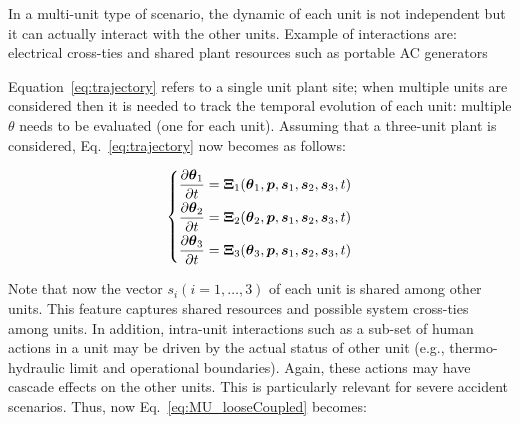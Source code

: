 In a multi-unit type of scenario, the dynamic of each unit is not independent but it can actually 
interact with the other units. Example of interactions are: electrical cross-ties and shared plant 
resources such as portable AC generators

Equation~\ref{eq:trajectory} refers to a single unit plant site; when multiple units are considered 
then it is needed to track the temporal evolution of each unit: multiple $\theta$ needs to be evaluated 
(one for each unit). 
Assuming that a three-unit plant is considered, Eq.~\ref{eq:trajectory} now becomes as follows:

\begin{equation}
  \begin{matrix}
     \begin{dcases*}
       \frac{\partial \boldsymbol{\theta}_1}{\partial t}  = \boldsymbol{\Xi}_1 (\boldsymbol{\theta}_1 , \boldsymbol p, \boldsymbol{s}_1 , \boldsymbol{s}_2 , \boldsymbol{s}_3, t)  \\     
       \frac{\partial \boldsymbol{\theta}_2}{\partial t}  = \boldsymbol{\Xi}_2 (\boldsymbol{\theta}_2 , \boldsymbol p, \boldsymbol{s}_1 , \boldsymbol{s}_2 , \boldsymbol{s}_3, t)  \\   
       \frac{\partial \boldsymbol{\theta}_3}{\partial t}  = \boldsymbol{\Xi}_3 (\boldsymbol{\theta}_3 , \boldsymbol p, \boldsymbol{s}_1 , \boldsymbol{s}_2 , \boldsymbol{s}_3, t)  \\       
     \end{dcases*}
  \end{matrix}
  \label{eq:MU_looseCoupled}
\end{equation}

Note that now the vector $s_i (i=1,\ldots,3)$ of each unit is shared among other units. This feature 
captures shared resources and possible system cross-ties among units.
In addition, intra-unit interactions such as a sub-set of human actions in a unit may be driven 
by the actual status of other unit (e.g., thermo-hydraulic limit and operational boundaries). 
Again, these actions may have cascade effects on the other units. This is particularly relevant 
for severe accident scenarios. Thus, now Eq.~\ref{eq:MU_looseCoupled} becomes:

